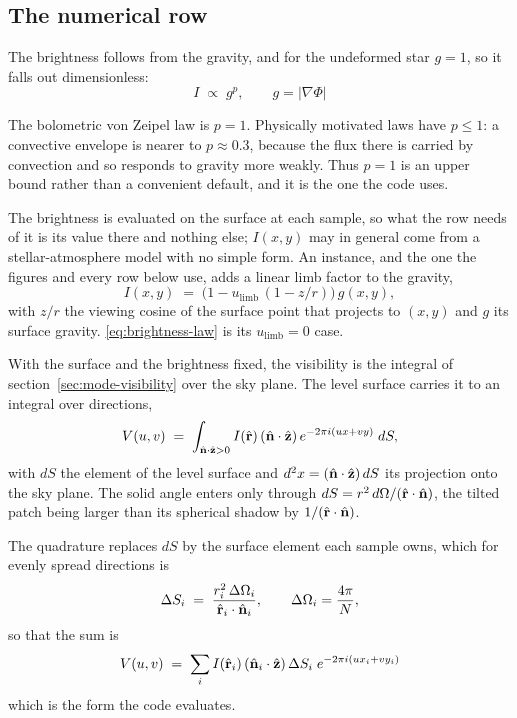 \subsection{The numerical row}
\label{sec:deformation-exact}

The brightness follows from the gravity, and for the undeformed star $g = 1$, so it falls
out dimensionless:
\begin{equation}
  I \;\propto\; g^{p} , \qquad g = |\nabla\Phi|
  \label{eq:brightness-law}
\end{equation}

The bolometric von Zeipel law is $p = 1$.  Physically motivated laws have $p \le 1$: a
convective envelope is nearer to $p \approx 0.3$, because the flux there is carried by
convection and so responds to gravity more weakly.  Thus $p = 1$ is an upper bound rather
than a convenient default, and it is the one the code uses.

The brightness is evaluated on the surface at each sample, so what the row needs of it is its
value there and nothing else; $I(x,y)$ may in general come from a stellar-atmosphere model with no
simple form.  An instance, and the one the figures and every row below use, adds a linear limb
factor to the gravity,
\begin{equation}
  I(x,y) \;=\; \bigl(1 - u_\text{limb}\,(1 - z/r)\bigr)\, g(x,y) ,
  \label{eq:brightness-example}
\end{equation}
with $z/r$ the viewing cosine of the surface point that projects to $(x,y)$ and $g$ its surface
gravity.  \eqref{eq:brightness-law} is its $u_\text{limb} = 0$ case.

With the surface and the brightness fixed, the visibility is the integral of
section~\ref{sec:mode-visibility} over the sky plane.  The level surface carries it to an integral
over directions,
\begin{equation}
  V(u,v) \;=\; \int_{\hat{\mathbf n}\cdot\hat{\mathbf z} > 0}
    I(\hat{\mathbf r})\,(\hat{\mathbf n}\cdot\hat{\mathbf z})\,
    e^{-2\pi i (u x + v y)}\; dS ,
  \label{eq:deformation-visibility-integral}
\end{equation}
with $dS$ the element of the level surface and $d^2x = (\hat{\mathbf n}\cdot\hat{\mathbf z})\,dS$
its projection onto the sky plane.  The solid angle enters only through
$dS = r^2\,d\Omega/(\hat{\mathbf r}\cdot\hat{\mathbf n})$, the tilted patch being larger than its
spherical shadow by $1/(\hat{\mathbf r}\cdot\hat{\mathbf n})$.

The quadrature replaces $dS$ by the surface element each sample owns, which for evenly spread
directions is
\begin{equation}
  \Delta S_i \;=\; \frac{r_i^2\,\Delta\Omega_i}{\hat{\mathbf r}_i\cdot\hat{\mathbf n}_i} ,
  \qquad \Delta\Omega_i = \frac{4\pi}{N} ,
  \label{eq:deformation-surface-element}
\end{equation}
so that the sum is
\begin{equation}
  V(u,v) \;=\; \sum_i I(\hat{\mathbf r}_i)\,(\hat{\mathbf n}_i\cdot\hat{\mathbf z})\,
    \Delta S_i\; e^{-2\pi i (u x_i + v y_i)}
  \label{eq:deformation-visibility}
\end{equation}
which is the form the code evaluates.


